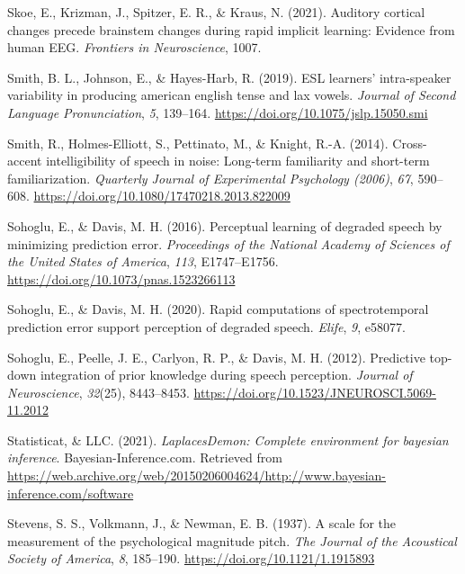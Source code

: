 \documentclass[
  11pt,
  man,floatsintext]{apa6}
\newlength{\cslhangindent}
\newlength{\cslentryspacingunit} %
\newenvironment{CSLReferences}[2] %
 {%
  \setlength{\parindent}{0pt}
  \ifodd #1
  \let\oldpar\par
  \def\par{\hangindent=\cslhangindent\oldpar}
  \fi
  \setlength{\parskip}{#2\cslentryspacingunit}
 }%
 {}
\begin{document}
\begin{CSLReferences}{1}{0}
\leavevmode{}%
Skoe, E., Krizman, J., Spitzer, E. R., \& Kraus, N. (2021). Auditory cortical changes precede brainstem changes during rapid implicit learning: Evidence from human EEG. \emph{Frontiers in Neuroscience}, 1007.

\leavevmode{}%
Smith, B. L., Johnson, E., \& Hayes-Harb, R. (2019). ESL learners' intra-speaker variability in producing american english tense and lax vowels. \emph{Journal of Second Language Pronunciation}, \emph{5}, 139--164. \url{https://doi.org/10.1075/jslp.15050.smi}

\leavevmode{}%
Smith, R., Holmes-Elliott, S., Pettinato, M., \& Knight, R.-A. (2014). Cross-accent intelligibility of speech in noise: Long-term familiarity and short-term familiarization. \emph{Quarterly Journal of Experimental Psychology (2006)}, \emph{67}, 590--608. \url{https://doi.org/10.1080/17470218.2013.822009}

\leavevmode{}%
Sohoglu, E., \& Davis, M. H. (2016). Perceptual learning of degraded speech by minimizing prediction error. \emph{Proceedings of the National Academy of Sciences of the United States of America}, \emph{113}, E1747--E1756. \url{https://doi.org/10.1073/pnas.1523266113}

\leavevmode{}%
Sohoglu, E., \& Davis, M. H. (2020). Rapid computations of spectrotemporal prediction error support perception of degraded speech. \emph{Elife}, \emph{9}, e58077.

\leavevmode{}%
Sohoglu, E., Peelle, J. E., Carlyon, R. P., \& Davis, M. H. (2012). Predictive top-down integration of prior knowledge during speech perception. \emph{Journal of Neuroscience}, \emph{32}(25), 8443--8453. \url{https://doi.org/10.1523/JNEUROSCI.5069-11.2012}

\leavevmode{}%
Statisticat, \& LLC. (2021). \emph{LaplacesDemon: Complete environment for bayesian inference}. Bayesian-Inference.com. Retrieved from \url{https://web.archive.org/web/20150206004624/http://www.bayesian-inference.com/software}

\leavevmode{}%
Stevens, S. S., Volkmann, J., \& Newman, E. B. (1937). A scale for the measurement of the psychological magnitude pitch. \emph{The Journal of the Acoustical Society of America}, \emph{8}, 185--190. \url{https://doi.org/10.1121/1.1915893}


\end{CSLReferences}
\end{document}
